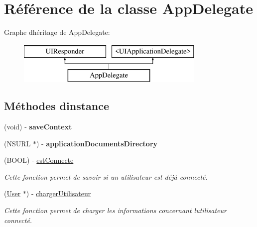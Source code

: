 \hypertarget{interface_app_delegate}{}\section{Référence de la classe App\+Delegate}
\label{interface_app_delegate}
Graphe d\textquotesingle{}héritage de App\+Delegate\+:\begin{figure}[H]
\begin{center}
\leavevmode
\includegraphics[height=2.000000cm]{interface_app_delegate}
\end{center}
\end{figure}
\subsection*{Méthodes d\textquotesingle{}instance}
\begin{DoxyCompactItemize}
\item 
\hypertarget{interface_app_delegate_affcb482ed45b506b0659be7277e805f9}{}(void) -\/ {\bfseries save\+Context}\label{interface_app_delegate_affcb482ed45b506b0659be7277e805f9}

\item 
\hypertarget{interface_app_delegate_a09e82eab31a341400477030e8b474b13}{}(N\+S\+U\+R\+L $\ast$) -\/ {\bfseries application\+Documents\+Directory}\label{interface_app_delegate_a09e82eab31a341400477030e8b474b13}

\item 
(B\+O\+O\+L) -\/ \hyperlink{interface_app_delegate_ad29ed8d846df7f5488924c05248e57f9}{est\+Connecte}
\begin{DoxyCompactList}\small\item\em Cette fonction permet de savoir si un utilisateur est déjà connecté. \end{DoxyCompactList}\item 
(\hyperlink{interface_user}{User} $\ast$) -\/ \hyperlink{interface_app_delegate_ad86b0c4b9f376e1702c9e2f7336c9eb9}{charger\+Utilisateur}
\begin{DoxyCompactList}\small\item\em Cette fonction permet de charger les informations concernant l\textquotesingle{}utilisateur connecté. \end{DoxyCompactList}\end{DoxyCompactItemize}
